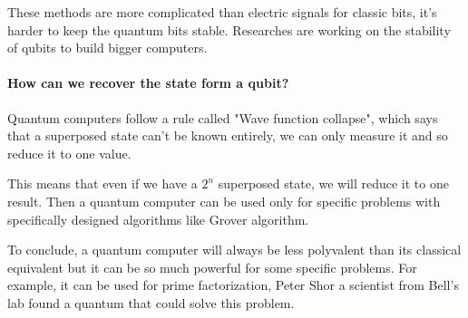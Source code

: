 These methods are more complicated than electric signals for classic bits, it's harder to keep the quantum bits stable. Researches are working on the stability of qubits to build bigger computers.

\paragraph{How can we recover the state form a qubit?}

Quantum computers follow a rule called "Wave function collapse", which says that a superposed state can't be known entirely, we can only measure it and so reduce it to one value.

This means that even if we have a $2^n$ superposed state, we will reduce it to one result. Then a quantum computer can be used only for specific problems with specifically designed algorithms like Grover algorithm. \newline

To conclude, a quantum computer will always be less polyvalent than its classical equivalent but it can be so much powerful for some specific problems. For example, it can be used for prime factorization, Peter Shor a scientist from Bell's lab found a quantum that could solve this problem. \newline
